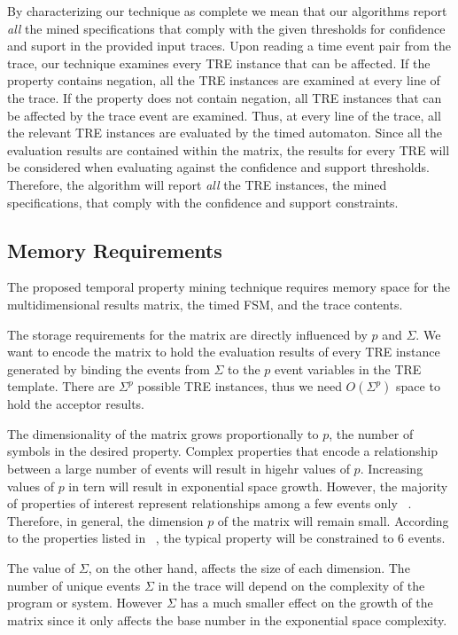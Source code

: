 \documentclass[]{sigplanconf}
\begin{document}
By characterizing our technique as complete we mean that our algorithms report \emph{all} the mined specifications that comply with the given thresholds for confidence and suport in the provided input traces. Upon reading a time event pair from the trace, our technique examines every TRE instance that can be affected. If the property contains negation, all the TRE instances are examined at every line of the trace. If the property does not contain negation, all TRE instances that can be affected by the trace event are examined. Thus, at every line of the trace, all the relevant TRE instances are evaluated by the timed automaton. Since all the evaluation results are contained within the matrix, the results for every TRE will be considered when evaluating against the confidence and support thresholds. Therefore, the algorithm will report \emph{all} the TRE instances, the mined specifications, that comply with the confidence and support constraints.


\subsection{Memory Requirements}

The proposed temporal property mining technique requires memory space for the multidimensional results matrix, the timed FSM, and the trace contents.

The storage requirements for the matrix are directly influenced by $p$ and $\Sigma$.
We want to encode the matrix to hold the evaluation results of every TRE instance generated by binding the events from $\Sigma$ to the $p$ event variables in the TRE template. There are $\Sigma^p$ possible TRE instances, thus we need $O(\Sigma^p)$ space to hold the acceptor results.

The dimensionality of the matrix grows proportionally to $p$, the number of symbols in the desired property.
Complex properties that encode a relationship between a large number of events will result in higehr values of $p$.
Increasing values of $p$ in tern will result in exponential space growth.
However, the majority of properties of interest represent relationships among a few events only ~\cite{evans1, dwyer1999patterns}.
Therefore, in general, the dimension $p$ of the matrix will remain small.
According to the properties listed in ~\cite{dwyer1999patterns, dwyer2}, the typical property will be constrained to 6 events.

The value of $\Sigma$, on the other hand, affects the size of each dimension.
The number of unique events $\Sigma$ in the trace will depend on the complexity of the program or system.
However $\Sigma$ has a much smaller effect on the growth of the matrix since it only affects the base number in the
exponential space complexity.
\end{document}
